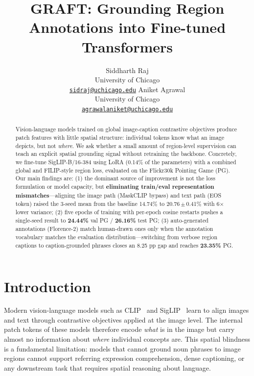 \documentclass{article}
\title{GRAFT: Grounding Region Annotations into Fine-tuned Transformers}
\author{Siddharth Raj\\
  University of Chicago\\
  \href{https://github.com/Ani0202/region-grounded}{\texttt{sidraj@uchicago.edu}}
  \And
  Aniket Agrawal\\
  University of Chicago\\
  \href{https://github.com/Ani0202/region-grounded}{\texttt{agrawalaniket@uchicago.edu}}
}
\begin{document}
\maketitle

\begin{abstract}
Vision-language models trained on global image-caption contrastive objectives
produce patch features with little spatial structure: individual tokens know
what an image depicts, but not \emph{where}.  We ask whether a small amount of
region-level supervision can teach an explicit spatial grounding signal without
retraining the backbone. Concretely, we fine-tune SigLIP-B/16-384 using LoRA
(0.14\% of the parameters) with a combined global and FILIP-style region loss,
evaluated on the Flickr30k Pointing Game (PG).  Our main findings are: (1) the
dominant source of improvement is not the loss formulation or model capacity,
but \textbf{eliminating train/eval representation mismatches}---aligning the
image path (MaskCLIP bypass) and text path (EOS token) raised the 3-seed mean
from the baseline 14.74\% to 20.76\,$\pm$\,0.41\% with 6$\times$ lower
variance; (2) five epochs of training with per-epoch cosine restarts pushes a
single-seed result to \textbf{24.44\%} val PG / \textbf{26.16\%} test PG;
(3) auto-generated annotations (Florence-2) match human-drawn ones only when
the annotation vocabulary matches the evaluation distribution---switching from
verbose region captions to caption-grounded phrases closes an 8.25 pp gap and
reaches \textbf{23.35\%} PG.
\end{abstract}

\section{Introduction}
\label{sec:intro}

Modern vision-language models such as CLIP~\cite{radford2021clip} and
SigLIP~\cite{zhai2023siglip} learn to align images and text through contrastive
objectives applied at the image level. The internal patch tokens of these models
therefore encode \emph{what} is in the image but carry almost no information
about \emph{where} individual concepts are. This spatial blindness is a
fundamental limitation: models that cannot ground noun phrases to image regions
cannot support referring expression comprehension, dense captioning, or any
downstream task that requires spatial reasoning about language.
\end{document}
